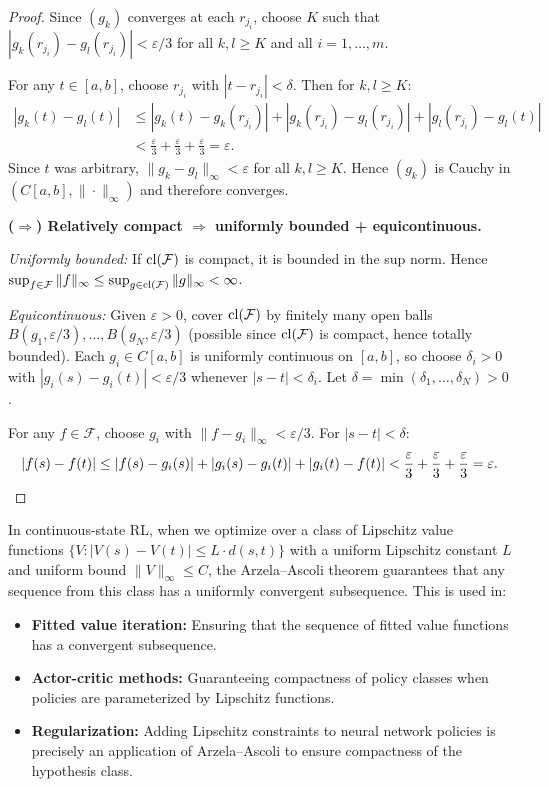 \documentclass[11pt,a4paper]{article}
\begin{document}
\begin{proof}
Since $(g_k)$ converges at each $r_{j_i}$, choose $K$ such that
$|g_k(r_{j_i}) - g_l(r_{j_i})| < \varepsilon/3$ for all $k, l \ge K$ and
all $i = 1, \ldots, m$.

For any $t \in [a,b]$, choose $r_{j_i}$ with $|t - r_{j_i}| < \delta$. Then
for $k, l \ge K$:
\begin{align*}
|g_k(t) - g_l(t)|
&\le |g_k(t) - g_k(r_{j_i})| + |g_k(r_{j_i}) - g_l(r_{j_i})|
   + |g_l(r_{j_i}) - g_l(t)| \\
&< \frac{\varepsilon}{3} + \frac{\varepsilon}{3}
   + \frac{\varepsilon}{3} = \varepsilon.
\end{align*}
Since $t$ was arbitrary, $\|g_k - g_l\|_\infty < \varepsilon$ for all
$k, l \ge K$. Hence $(g_k)$ is Cauchy in $(C[a,b], \|\cdot\|_\infty)$ and
therefore converges.

\medskip
\textbf{($\Rightarrow$) Relatively compact $\Rightarrow$ uniformly bounded
+ equicontinuous.}

\emph{Uniformly bounded:} If $\operatorname{cl}(\mathcal{F})$ is compact, it is bounded
in the sup norm. Hence $\sup_{f \in \mathcal{F}} \|f\|_\infty \le
\sup_{g \in \operatorname{cl}(\mathcal{F})} \|g\|_\infty < \infty$.

\emph{Equicontinuous:} Given $\varepsilon > 0$, cover $\operatorname{cl}(\mathcal{F})$ by
finitely many open balls $B(g_1, \varepsilon/3), \ldots,
B(g_N, \varepsilon/3)$ (possible since $\operatorname{cl}(\mathcal{F})$ is compact, hence
totally bounded). Each $g_i \in C[a,b]$ is uniformly continuous on $[a,b]$,
so choose $\delta_i > 0$ with $|g_i(s) - g_i(t)| < \varepsilon/3$ whenever
$|s - t| < \delta_i$. Let $\delta = \min(\delta_1, \ldots, \delta_N) > 0$.

For any $f \in \mathcal{F}$, choose $g_i$ with
$\|f - g_i\|_\infty < \varepsilon/3$. For $|s - t| < \delta$:
\[
|f(s) - f(t)| \le |f(s) - g_i(s)| + |g_i(s) - g_i(t)| + |g_i(t) - f(t)|
< \frac{\varepsilon}{3} + \frac{\varepsilon}{3} + \frac{\varepsilon}{3}
= \varepsilon. \qedhere
\]
\end{proof}

\begin{rlconnection}[title={Arzela--Ascoli in Policy Optimization}]
In continuous-state RL, when we optimize over a class of Lipschitz value
functions $\{V : |V(s) - V(t)| \le L \cdot d(s,t)\}$ with a uniform
Lipschitz constant $L$ and uniform bound $\|V\|_\infty \le C$, the
Arzela--Ascoli theorem guarantees that any sequence from this class has
a uniformly convergent subsequence. This is used in:
\begin{itemize}[nosep]
    \item \textbf{Fitted value iteration:} Ensuring that the sequence of
          fitted value functions has a convergent subsequence.
    \item \textbf{Actor-critic methods:} Guaranteeing compactness of policy
          classes when policies are parameterized by Lipschitz functions.
    \item \textbf{Regularization:} Adding Lipschitz constraints to neural
          network policies is precisely an application of Arzela--Ascoli to
          ensure compactness of the hypothesis class.
\end{itemize}
\end{rlconnection}
\end{document}
